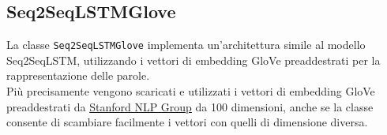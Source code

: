 \subsection{Seq2SeqLSTMGlove}
La classe \texttt{Seq2SeqLSTMGlove} implementa un'architettura simile al modello Seq2SeqLSTM, utilizzando i vettori di embedding GloVe preaddestrati per la rappresentazione delle parole.\\
Più precisamente vengono scaricati e utilizzati i vettori di embedding GloVe preaddestrati da \href{https://nlp.stanford.edu/projects/glove/}{Stanford NLP Group} da 100 dimensioni, anche se la classe consente di scambiare facilmente i vettori con quelli di dimensione diversa.\\


